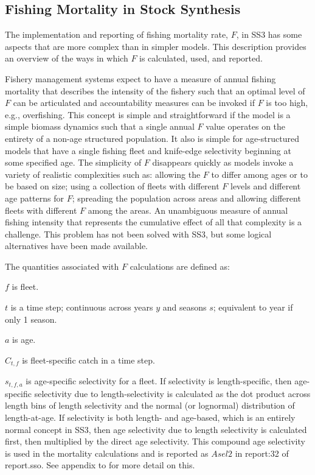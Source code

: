 \subsection{Fishing Mortality in Stock Synthesis}

The implementation and reporting of fishing mortality rate, $F$, in SS3 has some aspects that are more complex than in simpler models.  This description provides an overview of the ways in which $F$ is calculated, used, and reported.  

Fishery management systems expect to have a measure of annual fishing mortality that describes the intensity of the fishery such that an optimal level of $F$ can be articulated and accountability measures can be invoked if $F$ is too high, e.g., overfishing.  This concept is simple and straightforward if the model is a simple biomass dynamics such that a single annual $F$ value operates on the entirety of a non-age structured population. It also is simple for age-structured models that have a single fishing fleet and knife-edge selectivity beginning at some specified age. The simplicity of $F$ disappears quickly as models invoke a variety of realistic complexities such as: allowing the $F$ to differ among ages or to be based on size; using a collection of fleets with different $F$ levels and different age patterns for $F$; spreading the population across areas and allowing different fleets with different $F$ among the areas.  An unambiguous measure of annual fishing intensity that represents the cumulative effect of all that complexity is a challenge.  This problem has not been solved with SS3, but some logical alternatives have been made available.


The quantities associated with $F$ calculations are defined as:

$f$ is fleet.

$t$ is a time step; continuous across years $y$ and seasons $s$; equivalent to year if only 1 season.

$a$ is age.

$C_{t,f}$ is fleet-specific catch in a time step.

$s_{t,f,a}$ is age-specific selectivity for a fleet. If selectivity is length-specific, then age-specific selectivity due to length-selectivity is calculated as the dot product across length bins of length selectivity and the normal (or lognormal) distribution of length-at-age.  If selectivity is both length- and age-based, which is an entirely normal concept in SS3, then age selectivity due to length selectivity is calculated first, then multiplied by the direct age selectivity.  This compound age selectivity is used in the mortality calculations and is reported as $Asel2$ in report:32 of report.sso.  See appendix to \citet{methotstock2013} for more detail on this.

